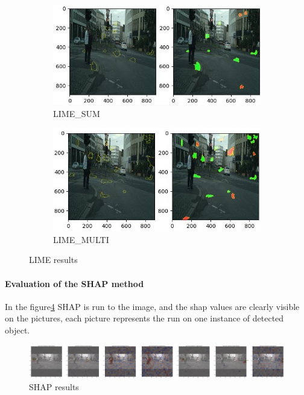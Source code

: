 \begin{figure}[h]
    \centering
    \begin{subfigure}[b]{0.47\textwidth}
        \centering
        \includegraphics[width=\textwidth]{figures/best-box_bonn_000035_000019_leftImg8bit}
        \caption{LIME\_SUM}
        \label{fig:LIME1}
    \end{subfigure}
    \hfill
    \begin{subfigure}[b]{0.47\textwidth}
        \centering
        \includegraphics[width=\textwidth]{figures/best-box_bonn_000035_000019_leftImg8bit_MULTI}
        \caption{LIME\_MULTI}
        \label{fig:LIME2}
    \end{subfigure}
    \hfill
    \caption{LIME results}
    \label{fig:LIME_results}
\end{figure}

\paragraph{Evaluation of the SHAP method}\label{par:evaluation-of-the-shap-method}
In the figure\ref{fig:SHAP_result} SHAP is run to the image, and the shap values are clearly visible on the pictures, each picture represents the run on one instance of detected object.
\begin{figure}[h]
    \centering
        \centering
        \includegraphics[width=\textwidth]{figures/output1}
        \caption{SHAP results}
        \label{fig:SHAP_result}
\end{figure}

